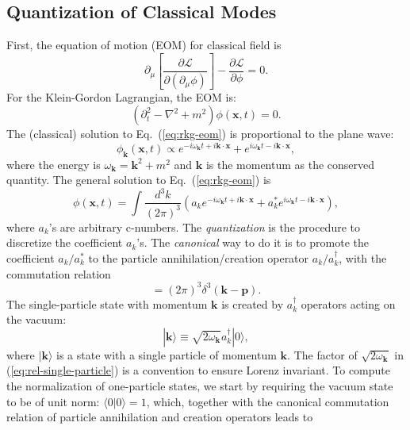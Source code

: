 \documentclass[aps,prb,superscriptaddress,nofootinbib]{revtex4}
\begin{document}
\subsection{Quantization of Classical Modes}
First, the equation of motion (EOM) for classical field is
\begin{equation}
	\partial_\mu \left[\frac{\partial \mathcal L}{\partial(\partial_\mu \phi)}\right] - \frac{\partial \mathcal L}{\partial \phi} = 0.
\end{equation}
For the Klein-Gordon Lagrangian, the EOM is:
\begin{equation}\label{eq:rkg-eom}
	(\partial_t^2-\nabla^2+m^2)\phi(\bm x,t) = 0.
\end{equation}
The (classical) solution to Eq.~(\ref{eq:rkg-eom}) is proportional to the plane wave:
\begin{equation}
	\phi_{\bm k}(\bm x, t) \propto e^{-i\omega_{\bm{k}}t+i\bm{k}\cdot\bm{x}} + e^{i\omega_{\bm{k}}t-i\bm{k}\cdot\bm{x}},
\end{equation}
where the energy is $\omega_{\bm{k}}=\bm{k}^2+m^2$ and $\bm k$ is the momentum as the conserved quantity.
The general solution to Eq.~(\ref{eq:rkg-eom}) is
\begin{equation}
	\phi(\bm x,t) = \int \frac{d^{3} k}{(2\pi)^{3}} \left(
		a_{k}e^{-i\omega_{\bm{k}}t+i\bm{k}\cdot\bm{x}} + 
		a^*_{k}e^{i\omega_{\bm{k}}t-i\bm{k}\cdot\bm{x}} 
	\right),
\end{equation}
where $a_k$'s are arbitrary c-numbers.
The \textit{quantization} is the procedure to discretize the coefficient $a_k$'s.
The \textit{canonical} way to do it is to promote the coefficient $a_{k}/a_{k}^*$ to the particle annihilation/creation operator $a_{k}/a_{k}^\dagger$, with the commutation relation
\begin{equation}
	[a_{k}, a_{p}^\dagger] = (2\pi)^{3} \delta^{3}(\bm{k}-\bm{p}).
\end{equation}
The single-particle state with momentum $\bm k$ is created by $a_{k}^{\dagger}$ operators acting on the vacuum:
\begin{equation}
	|\bm{k}\rangle \equiv \sqrt{2\omega_{\bm k}} a_{k}^{\dagger}|0\rangle,
	\label{eq:rel-single-particle}
\end{equation}
where $|\bm{k}\rangle$ is a state with a single particle of momentum $\bm{k}$.
The factor of $\sqrt{2 \omega_{\bm k}}$ in (\ref{eq:rel-single-particle}) is a convention to ensure Lorenz invariant.
To compute the normalization of one-particle states, we start by requiring the vacuum state to be of unit norm: $\langle 0|0\rangle=1$, which, together with the canonical commutation relation of particle annihilation and creation operators leads to
\end{document}
